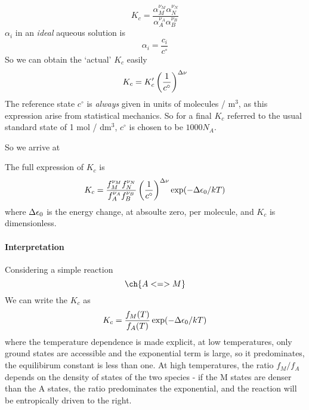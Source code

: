 \begin{equation}
  K_c=\frac{\alpha_M^{\nu_M}\alpha_N^{\nu_N}}{\alpha_A^{\nu_A}\alpha_B^{\nu_B}}
\end{equation}
$\alpha_i$ in an \emph{ideal} aqueous solution is
\begin{equation}
  \alpha_i=\frac{c_i}{c^{\circ}}
\end{equation}
So we can obtain the `actual' $K_c$ easily
\begin{equation}
  K_c=K_c'\left(\frac{1}{c^{\circ}}\right)^{\Delta\nu}
\end{equation}
The reference state $c^{\circ}$ is \emph{always} given in units of molecules / m$^3$, as this expression arise from statistical mechanics. So for a final $K_c$ referred to the usual standard state of 1 mol / dm$^3$, $c^{\circ}$ is chosen to be $1000N_A$.\par
So we arrive at
\begin{thrm}[Expression of $K_c$]
\label{statmechkc}
The full expression of $K_c$ is
\begin{equation}
  K_c=\frac{f_M^{\nu_M}f_N^{\nu_N}}{f_A^{\nu_A}f_B^{\nu_B}}\left(\frac{1}{c^{\circ}}\right)^{\Delta\nu}\exp(-\Delta\epsilon_0/kT)
\end{equation}
where $\Delta\epsilon_0$ is the energy change, at absoulte zero, per molecule, and $K_c$ is dimensionless.
\end{thrm}
\paragraph{Interpretation}
Considering a simple reaction
\begin{equation*}
  \ch{A <=> M}
\end{equation*}
We can write the $K_c$ as
\begin{equation}
  K_c=\frac{f_M(T)}{f_A(T)}\exp(-\Delta\epsilon_0/kT)
\end{equation}
where the temperature dependence is made explicit, at low temperatures, only ground states are accessible and the exponential term is large, so it predominates, the equilibirum constant is less than one. At high temperatures, the ratio $f_M/f_A$ depends on the density of states of the two species - if the M states are denser than the A states, the ratio predominates the exponential, and the reaction will be entropically driven to the right.
